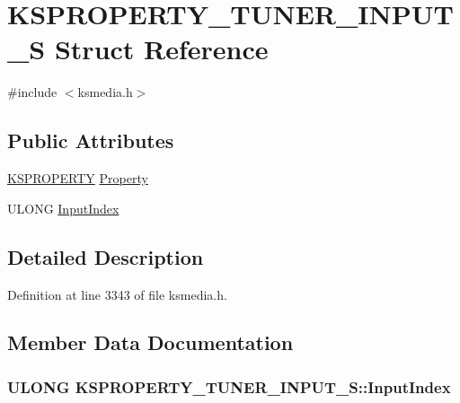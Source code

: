 \hypertarget{struct_k_s_p_r_o_p_e_r_t_y___t_u_n_e_r___i_n_p_u_t___s}{}\section{K\+S\+P\+R\+O\+P\+E\+R\+T\+Y\+\_\+\+T\+U\+N\+E\+R\+\_\+\+I\+N\+P\+U\+T\+\_\+S Struct Reference}
\label{struct_k_s_p_r_o_p_e_r_t_y___t_u_n_e_r___i_n_p_u_t___s}


{\ttfamily \#include $<$ksmedia.\+h$>$}

\subsection*{Public Attributes}
\begin{DoxyCompactItemize}
\item 
\hyperlink{ks_8h_a4392f77c74e868d813d46c39ada4d660}{K\+S\+P\+R\+O\+P\+E\+R\+TY} \hyperlink{struct_k_s_p_r_o_p_e_r_t_y___t_u_n_e_r___i_n_p_u_t___s_ac63100c3dc0152d45a8b00bcc6e1df49}{Property}
\item 
U\+L\+O\+NG \hyperlink{struct_k_s_p_r_o_p_e_r_t_y___t_u_n_e_r___i_n_p_u_t___s_ab7c632a52a7e4bf6ee19a6a67ff928ff}{Input\+Index}
\end{DoxyCompactItemize}


\subsection{Detailed Description}


Definition at line 3343 of file ksmedia.\+h.



\subsection{Member Data Documentation}
\subsubsection[{\texorpdfstring{Input\+Index}{InputIndex}}]{\setlength{\rightskip}{0pt plus 5cm}U\+L\+O\+NG K\+S\+P\+R\+O\+P\+E\+R\+T\+Y\+\_\+\+T\+U\+N\+E\+R\+\_\+\+I\+N\+P\+U\+T\+\_\+\+S\+::\+Input\+Index}\hypertarget{struct_k_s_p_r_o_p_e_r_t_y___t_u_n_e_r___i_n_p_u_t___s_ab7c632a52a7e4bf6ee19a6a67ff928ff}{}\label{struct_k_s_p_r_o_p_e_r_t_y___t_u_n_e_r___i_n_p_u_t___s_ab7c632a52a7e4bf6ee19a6a67ff928ff}



